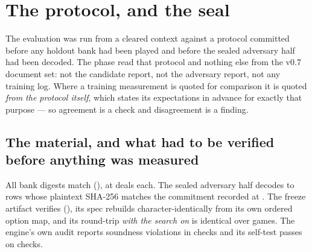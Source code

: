 \section{The protocol, and the seal}
\label{sec:protocol}

The evaluation was run from a cleared context against a protocol committed before any holdout bank had
been played and before the sealed adversary half had been decoded. The phase read that protocol and
nothing else from the v0.7 document set: not the candidate report, not the adversary report, not any
training log. Where a training measurement is quoted for comparison it is quoted \emph{from the
protocol itself}, which states its expectations in advance for exactly that purpose --- so agreement
is a check and disagreement is a finding.

\subsection{The material, and what had to be verified before anything was measured}
\label{sec:protocol-material}

\begin{table}[t]\centering
\caption{The deal banks, each digest recomputed before any cell was played by folding the six dealt
hands and the dealer of every deal into a rolling hash without constructing a policy or playing a
game. The committed digests were computed by a \emph{different build} of the engine at seal time, so
agreement is between two binaries as well as two dates.}
\label{tab:banks}

\end{table}

All \vsevenBanks{} bank digests match (\vsevenBanksMatch{}), at \vsevenBankDeals{} deals each. The
sealed adversary half decodes to \vsevenSealedRows{} rows whose plaintext SHA-256 matches the
commitment recorded at \texttt{\vsevenSealCommit{}}. The freeze artifact verifies
(\vsevenFreezeVerify{}), its spec rebuilds character-identically from its own ordered option map, and
its round-trip \emph{with the search on} is identical over \vsevenRtwoaGames{} games. The engine's own
audit reports \vsevenVerifyViolations{} soundness violations in \vsevenVerifyChecks{} checks and its
self-test passes on \vsevenSelftestChecks{} checks.

\begin{table}[t]\centering
\caption{The calibrated side-channel positive controls, on holdout material. \emph{Must fail} is the
set the protocol names for each planted channel in advance --- not one test each; the seed cheat is
visible to two of them. A cheat failing a test outside its own set, or missing one inside it, would
mean the gate does not discriminate and no seat-isolation statement in this paper could be read as a
measurement.}
\label{tab:sidechannel}
{\small}
\end{table}

